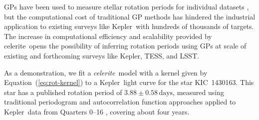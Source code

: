 \documentclass[manuscript, letterpaper]{aastex6}
\newcommand{\project}[1]{\textsf{#1}}
\newcommand{\kepler}{\project{Kepler}}
\newcommand{\lsst}{\project{LSST}}
\newcommand{\tess}{\project{TESS}}
\newcommand{\celerite}{\project{celerite}}
\newcommand{\celeriteterm}{\emph{celerite}}
\renewcommand{\eqref}[1]{\ref{eq:#1}}
\newcommand{\Eq}[1]{Equation~(\eqref{#1})}
\newcommand{\eq}[1]{\Eq{#1}}
\newcommand{\response}[1]{{#1}}
\begin{document}
\response{GPs have been used to measure stellar rotation periods for
    individual datasets \citep[for example][]{Littlefair:2017}, but the
    computational cost of traditional GP methods has hindered the industrial
    application to existing surveys like \kepler\ with hundreds of thousands of
    targets.
    The increase in computational efficiency and scalability provided by
    \celerite\ opens the possibility of inferring rotation periods using GPs at
    scale of existing and forthcoming surveys like \kepler, \tess, and \lsst.
}

As a demonstration, we fit a \celeriteterm\ model with a kernel given
by \eq{rot-kernel} to a \kepler\ light curve for the star KIC~1430163.
This star has a published rotation period of $3.88 \pm 0.58\,\mathrm{days}$,
measured using traditional periodogram and autocorrelation function approaches
applied to \kepler\ data from Quarters 0--16 \citep{Mathur:2014}, covering
about four years.
\end{document}
